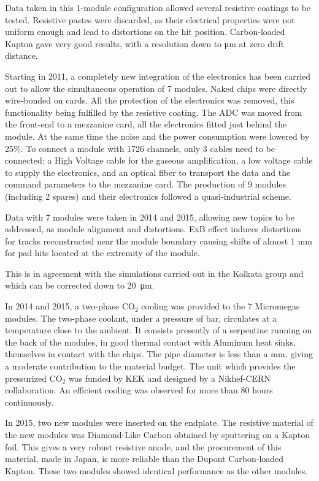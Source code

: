 Data taken in this 1-module configuration allowed several resistive coatings to be tested. Resistive pastes were discarded, as
their electrical properties were not uniform enough and lead to distortions on the hit position. Carbon-loaded Kapton gave
very good results, with a resolution down to \unit[70]{\micro m} at zero drift distance.

Starting in 2011, a completely new integration of the electronics has been carried out to allow the simultaneous operation
of 7 modules. Naked chips were directly wire-bonded on cards. All the protection of the electronics was removed, this functionality
being fulfilled by the resistive coating. The ADC was moved from the front-end to a mezzanine card, all the electronics fitted just behind the module.
At the same time the noise and the power consumption were lowered by 25\%. To connect a module with 1726 channels, only
3 cables need to be connected: a High Voltage cable for the gaseous amplification, a low voltage cable to supply the electronics,
and an optical fiber to transport the data and the command parameters to the mezzanine card.
The production of 9 modules (including 2 spares) and their electronics followed a quasi-industrial scheme.

Data with 7 modules were taken in 2014 and 2015, allowing new topics to be addressed, as module alignment and distortions.
ExB effect induces distortions for tracks reconstructed near the module boundary causing
shifts of almost 1 mm for pad hits located at the extremity of the module.


This is
in agreement with the simulations carried out in the Kolkata group and which can be corrected down to \SI{20}{\micro\meter}.

In 2014 and 2015, a two-phase CO$_2$ cooling was provided to the 7 Micromegas modules. The two-phase coolant, under a pressure of \unit[50]{bar}, circulates at a temperature close to the ambient.
It consists presently of a serpentine running on the back of the modules, in good thermal contact with Aluminum heat sinks, themselves in contact with the chips. The pipe diameter is less than a \si{\milli\meter}, giving a moderate contribution to the material budget. The unit
which provides the pressurized CO$_2$ was funded by KEK and designed by a Nikhef-CERN collaboration.
An efficient cooling was observed for more than 80 hours continuously.

In 2015, two new modules were inserted on the endplate. The resistive material of the new
modules was Diamond-Like Carbon obtained by sputtering on a Kapton foil.
This gives a very robust resistive anode, and the procurement of this material, made in Japan, is more reliable
than the Dupont Carbon-loaded Kapton. These two modules showed identical performance as the other modules.

